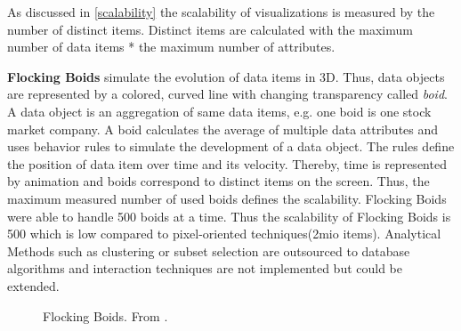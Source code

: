 As discussed in \ref{scalability} the scalability of visualizations is measured by the number of distinct items. Distinct items are calculated with the maximum number of data items * the maximum number of attributes. 

\textbf{Flocking Boids} simulate the evolution of data items in 3D. Thus, data objects are represented by a colored, curved line with changing transparency called \textit{boid}.  A data object is an aggregation of same data items, e.g. one boid is one stock market company. A boid calculates the average of multiple data attributes and uses behavior rules to simulate the development of a data object. The rules define the position of data item over time and its velocity. Thereby, time is represented by animation and boids correspond to distinct items on the screen. Thus, the maximum measured number of used boids defines the scalability. Flocking Boids were able to handle 500 boids at a time. Thus the scalability of Flocking Boids is 500 which is low compared to pixel-oriented techniques(2mio items)\cite{Moere2004}.
Analytical Methods such as clustering or subset selection are outsourced to database algorithms and interaction techniques are not implemented but could be extended\cite{Moere2004}. 
\begin{figure}[H]
    \centering
    \caption{Flocking Boids. From \cite{Aigner2011}.}
    \label{fig:flockingboids}
\end{figure}
